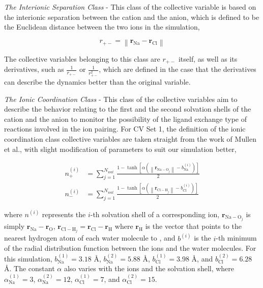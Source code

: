 \begin{spacing}{2.0}
    \textsl{The Interionic Separation Class} - This class of the collective variable is based on the interionic separation between the cation and 
    the anion, which is defined to be the Euclidean distance between the two ions in the simulation,

    \begin{equation}
        r_{+-} = \left\lVert \mathbf{r}_{\mathrm{Na}} - \mathbf{r}_{\mathrm{Cl}} \right\rVert
        \label{eq:r-definition}
    \end{equation}

    The collective variables belonging to this class are $r_{+-}$ itself, as well as its derivatives, such as $\frac{1}{r_{+-}}$ or 
    $\frac{1}{r_{+-}^2}$, which are defined in the case that the derivatives can describe the dynamics better than the original variable.

    \textsl{The Ionic Coordination Class} - This class of the collective variables aim to describe the behavior relating to the first and the second 
    solvation shells of the cation and the anion to monitor the possibility of the ligand exchange type of reactions involved in the ion pairing. 
    For CV Set 1, the definition of the ionic coordination class collective variables are taken straight from the work of Mullen et al., with slight 
    modification of parameters to suit our simulation better,

    \begin{equation}\begin{aligned}
        n_+^{(i)} &= \sum_{j=1}^{N_{wat}}\frac{1-\tanh\left[\alpha\left(\left\lVert\mathbf{r}_{\mathrm{Na-O}_j}\right\rVert - b_{\mathrm{Na}}^{(i)}\right)\right]}{2} \\
        n_-^{(i)} &= \sum_{j=1}^{N_{wat}}\frac{1-\tanh\left[\alpha\left(\left\lVert\mathbf{r}_{\mathrm{Cl-H}_j}\right\rVert - b_{\mathrm{Cl}}^{(i)}\right)\right]}{2}
    \end{aligned}\end{equation}

    \noindent where $n^{(i)}$ represents the $i$-th solvation shell of a corresponding ion, $\mathbf{r}_{\mathrm{Na-O}_j}$ is simply 
    $\mathbf{r}_{\mathrm{Na}} - \mathbf{r}_{\mathrm{O}}$, $\mathbf{r}_{\mathrm{Cl-H}_j} = \mathbf{r}_{\mathrm{Cl}} - \mathbf{r}_{\mathrm{H}}$ where 
    $\mathbf{r}_{\mathrm{H}}$ is the vector that points to the nearest hydrogen atom of each water molecule to , and $b^{(i)}$ is the
    $i$-th minimum of the radial distribution function between the ions and the water molecules. For this simulation, $b_{\mathrm{Na}}^{(1)} = 3.18$ \r{A},
    $b_{\mathrm{Na}}^{(2)} = 5.88$ \r{A}, $b_{\mathrm{Cl}}^{(1)} = 3.98$ \r{A}, and $b_{\mathrm{Cl}}^{(2)} = 6.28$ \r{A}. The constant $\alpha$ also
    varies with the ions and the solvation shell, where $\alpha_{\mathrm{Na}}^{(1)} = 3$, $\alpha_{\mathrm{Na}}^{(2)} = 12$, $\alpha_{\mathrm{Cl}}^{(1)} = 7$,
    and $\alpha_{\mathrm{Cl}}^{(2)} = 15$. %


\end{spacing}
